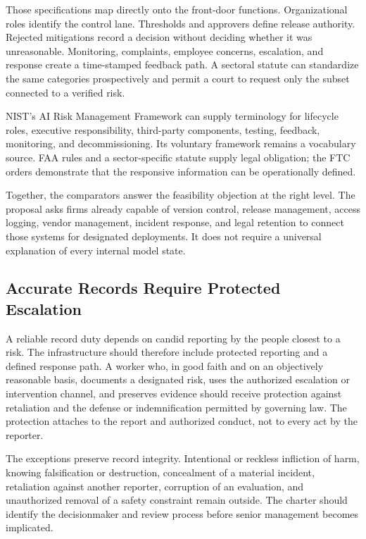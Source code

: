 Those specifications map directly onto the front-door functions. Organizational roles identify the control lane. Thresholds and approvers define release authority. Rejected mitigations record a decision without deciding whether it was unreasonable. Monitoring, complaints, employee concerns, escalation, and response create a time-stamped feedback path. A sectoral statute can standardize the same categories prospectively and permit a court to request only the subset connected to a verified risk.

NIST's AI Risk Management Framework can supply terminology for lifecycle roles, executive responsibility, third-party components, testing, feedback, monitoring, and decommissioning. Its voluntary framework remains a vocabulary source. FAA rules and a sector-specific statute supply legal obligation; the FTC orders demonstrate that the responsive information can be operationally defined.

Together, the comparators answer the feasibility objection at the right level. The proposal asks firms already capable of version control, release management, access logging, vendor management, incident response, and legal retention to connect those systems for designated deployments. It does not require a universal explanation of every internal model state.

\subsection{Accurate Records Require Protected Escalation}

A reliable record duty depends on candid reporting by the people closest to a risk. The infrastructure should therefore include protected reporting and a defined response path. A worker who, in good faith and on an objectively reasonable basis, documents a designated risk, uses the authorized escalation or intervention channel, and preserves evidence should receive protection against retaliation and the defense or indemnification permitted by governing law. The protection attaches to the report and authorized conduct, not to every act by the reporter.

The exceptions preserve record integrity. Intentional or reckless infliction of harm, knowing falsification or destruction, concealment of a material incident, retaliation against another reporter, corruption of an evaluation, and unauthorized removal of a safety constraint remain outside. The charter should identify the decisionmaker and review process before senior management becomes implicated.

